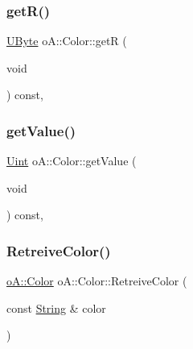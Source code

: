\subsubsection{\texorpdfstring{get\+R()}{getR()}}
{\footnotesize\ttfamily \mbox{\hyperlink{namespaceo_a_a8c38e43a304d568b8495770dd8d50513}{U\+Byte}} o\+A\+::\+Color\+::getR (\begin{DoxyParamCaption}\item[{void}]{ }\end{DoxyParamCaption}) const\hspace{0.3cm}{\ttfamily [inline]}, {\ttfamily [noexcept]}}

\mbox{\label{classo_a_1_1_color_ac010d6318a14cebb3123929159fbab93}} 
\subsubsection{\texorpdfstring{get\+Value()}{getValue()}}
{\footnotesize\ttfamily \mbox{\hyperlink{namespaceo_a_abe1d8250226c5cf34f84d7b75fc7922e}{Uint}} o\+A\+::\+Color\+::get\+Value (\begin{DoxyParamCaption}\item[{void}]{ }\end{DoxyParamCaption}) const\hspace{0.3cm}{\ttfamily [inline]}, {\ttfamily [noexcept]}}

\mbox{\label{classo_a_1_1_color_ae637744de31ea0e978b58a836db49884}} 
\subsubsection{\texorpdfstring{Retreive\+Color()}{RetreiveColor()}}
{\footnotesize\ttfamily \mbox{\hyperlink{classo_a_1_1_color}{o\+A\+::\+Color}} o\+A\+::\+Color\+::\+Retreive\+Color (\begin{DoxyParamCaption}\item[{const \mbox{\hyperlink{classo_a_1_1_string}{String}} \&}]{color }\end{DoxyParamCaption})\hspace{0.3cm}{\ttfamily [static]}}

\mbox{\label{classo_a_1_1_color_aaf0ba215d5bd4946f93a68bab2a8d66d}} 
